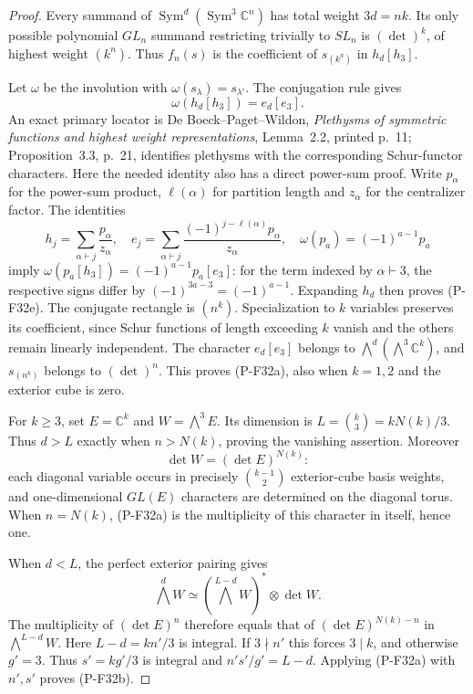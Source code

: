 \begin{proof}
Every summand of $\operatorname{Sym}^d(\operatorname{Sym}^3
\mathbb C^n)$ has total weight $3d=nk$. Its only possible
polynomial $GL_n$ summand restricting trivially to $SL_n$
is $(\det)^k$, of highest weight $(k^n)$. Thus $f_n(s)$
is the coefficient of $s_{(k^n)}$ in $h_d[h_3]$.

Let $\omega$ be the involution with
$\omega(s_\lambda)=s_{\lambda'}$. The conjugation rule gives
\[
                         \omega(h_d[h_3])=e_d[e_3].
 \tag{P-F32e}
\]
An exact primary locator is De Boeck--Paget--Wildon,
\emph{Plethysms of symmetric functions and highest weight
representations}, Lemma~2.2, printed p.~11; Proposition~3.3, p.~21,
identifies plethysms with the corresponding Schur-functor
characters. Here the needed identity also has a direct
power-sum proof. Write $p_\alpha$ for the power-sum product,
$\ell(\alpha)$ for partition length and $z_\alpha$ for the
centralizer factor. The identities
\[
 h_j=\sum_{\alpha\vdash j}\frac{p_\alpha}{z_\alpha},
 \quad
 e_j=\sum_{\alpha\vdash j}
          \frac{(-1)^{j-\ell(\alpha)}p_\alpha}{z_\alpha},
 \quad \omega(p_a)=(-1)^{a-1}p_a
\]
imply $\omega(p_a[h_3])=(-1)^{a-1}p_a[e_3]$:
for the term indexed by $\alpha\vdash3$, the respective
signs differ by $(-1)^{3a-3}=(-1)^{a-1}$.
Expanding $h_d$ then proves (P-F32e).
The conjugate rectangle is $(n^k)$. Specialization to
$k$ variables preserves its coefficient, since Schur
functions of length exceeding $k$ vanish and the others
remain linearly independent. The character $e_d[e_3]$
belongs to $\bigwedge^d(\bigwedge^3\mathbb C^k)$, and
$s_{(n^k)}$ belongs to $(\det)^n$. This proves (P-F32a),
also when $k=1,2$ and the exterior cube is zero.

For $k\ge3$, set $E=\mathbb C^k$ and $W=\bigwedge^3E$.
Its dimension is $L=\binom{k}{3}=kN(k)/3$. Thus $d>L$
exactly when $n>N(k)$, proving the vanishing assertion.
Moreover
\[
                       \det W=(\det E)^{N(k)}:
 \tag{P-F32f}
\]
each diagonal variable occurs in precisely $\binom{k-1}{2}$
exterior-cube basis weights, and one-dimensional $GL(E)$
characters are determined on the diagonal torus.
When $n=N(k)$, (P-F32a) is the multiplicity of this
character in itself, hence one.

When $d<L$, the perfect exterior pairing gives
\[
 \bigwedge^dW\simeq
        \left(\bigwedge^{L-d}W\right)^*\otimes\det W.
 \tag{P-F32g}
\]
The multiplicity of $(\det E)^n$ therefore equals that
of $(\det E)^{N(k)-n}$ in $\bigwedge^{L-d}W$.
Here $L-d=kn'/3$ is integral. If $3\nmid n'$ this
forces $3\mid k$, and otherwise $g'=3$. Thus
$s'=kg'/3$ is integral and $n's'/g'=L-d$.
Applying (P-F32a) with $n',s'$ proves (P-F32b).


\end{proof}

